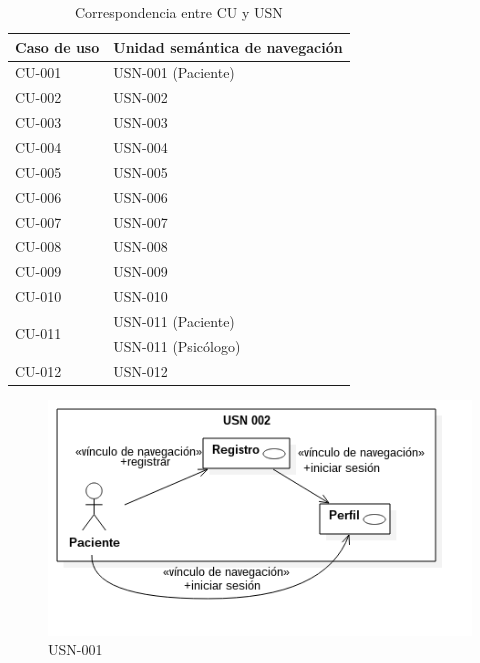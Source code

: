 \begin{table}[htpb]
\centering
\begin{tabular}{|l|l|}
\hline
\rowcolor[gray]{0.9}\textbf{Caso de uso}    & \textbf{Unidad semántica de navegación} \\ \hline
CU-001                  & USN-001 (Paciente)                      \\ \hline
CU-002                  & USN-002                                 \\ \hline
CU-003                  & USN-003                                 \\ \hline
CU-004                  & USN-004                                 \\ \hline
CU-005                  & USN-005                                 \\ \hline
CU-006                  & USN-006                                 \\ \hline
CU-007                  & USN-007                                 \\ \hline
CU-008                  & USN-008                                 \\ \hline
CU-009                  & USN-009                                 \\ \hline
CU-010                  & USN-010                                 \\ \hline
\multirow{2}{*}{CU-011} & USN-011 (Paciente)                      \\ \cline{2-2} 
                        & USN-011 (Psicólogo)                     \\ \hline
CU-012                  & USN-012                                 \\ \hline
\end{tabular}
\caption{Correspondencia entre CU y USN}
\label{cu_usn}
\end{table}

\begin{figure}[htbp] 
    \centering
    \includegraphics[width=1\textwidth]{figuras/usn/usn001_pac.png}
    \caption{USN-001}
    \label{fig:usn-001}
\end{figure}	

